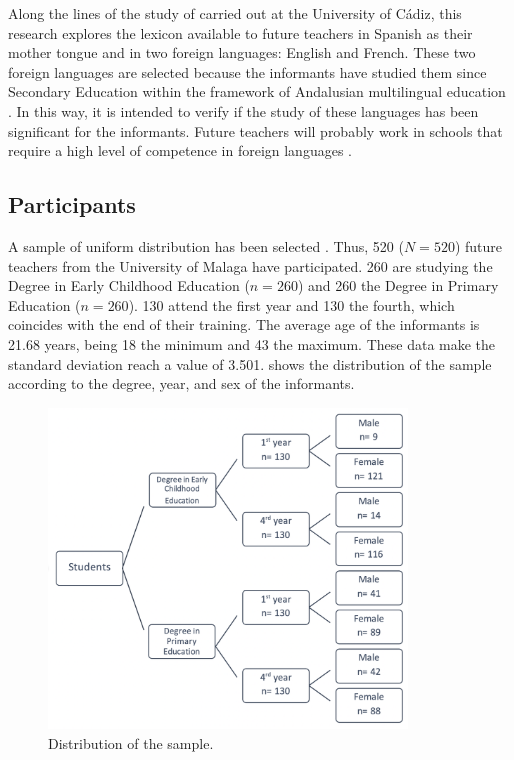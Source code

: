 \documentclass[english]{textolivre}
\begin{document}
Along the lines of the study of \textcite{santos_diaz_concepto_2022} carried out at the University of Cádiz, this research explores the lexicon available to future teachers in Spanish as their mother tongue and in two foreign languages: English and French. These two foreign languages are selected because the informants have studied them since Secondary Education within the framework of Andalusian multilingual education \cite{junta_de_andalucia_acuerdo_2005,junta_de_andalucia_plan_2016}. In this way, it is intended to verify if the study of these languages has been significant for the informants. Future teachers will probably work in schools that require a high level of competence in foreign languages \cite{trigo_ibanez_comunicarse_2021}.

\subsection{Participants}\label{sec-conduta}
A sample of uniform distribution has been selected \cite{perez_juste_estadistica_2009}. Thus, 520 ($N=520$) future teachers from the University of Malaga have participated. 260 are studying the Degree in Early Childhood Education ($n=260$) and 260 the Degree in Primary Education ($n=260$). 130 attend the first year and 130 the fourth, which coincides with the end of their training. The average age of the informants is 21.68 years, being 18 the minimum and 43 the maximum. These data make the standard deviation reach a value of 3.501.  shows the distribution of the sample according to the degree, year, and sex of the informants.

\begin{figure}[htbp]
 \centering
 \includegraphics[width=0.85\textwidth]{Fig1.png}
 \caption{Distribution of the sample.}
 \label{fig01}
\end{figure}
\end{document}
